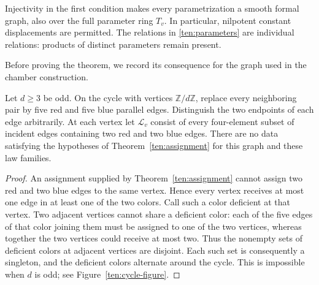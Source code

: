 Injectivity in the first condition makes every parametrization a smooth
formal graph, also over the full parameter ring \(T_v\).  In particular,
nilpotent constant displacements are permitted.  The relations in
\eqref{ten:parameters} are individual relations: products of distinct
parameters remain present.

Before proving the theorem, we record its consequence for the graph used
in the chamber construction.

\begin{corollary}\label{ten:odd-cycle}
Let \(d\geq3\) be odd.  On the cycle with vertices \(\mathbb Z/d\mathbb Z\),
replace every neighboring pair by five red and five blue parallel
edges.  Distinguish the two endpoints of each edge arbitrarily.  At
each vertex let \(\mathcal L_v\) consist of every four-element subset
of incident edges containing two red and two blue edges.  There are
no data satisfying the hypotheses of Theorem~\ref{ten:assignment} for
this graph and these law families.
\end{corollary}

\begin{proof}
An assignment supplied by Theorem~\ref{ten:assignment} cannot assign
two red and two blue edges to the same vertex.  Hence every vertex
receives at most one edge in at least one of the two colors.
Call such a color deficient at that vertex.  Two adjacent vertices
cannot share a deficient color: each of the five edges of that color
joining them must be assigned to one of the two vertices, whereas together
the two vertices could receive at most two.  Thus the nonempty sets of
deficient colors at adjacent vertices are disjoint.  Each such set
is consequently a singleton, and the deficient colors alternate
around the cycle.  This is impossible when \(d\) is odd; see
Figure~\ref{ten:cycle-figure}.
\end{proof}


